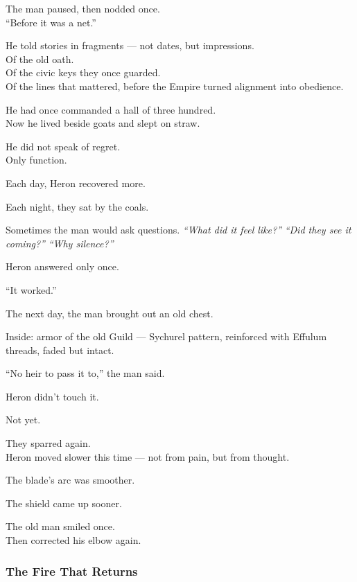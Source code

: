 \documentclass[12pt]{article}
\begin{document}
The man paused, then nodded once.\\
“Before it was a net.”

\vspace{1em}

He told stories in fragments — not dates, but impressions.\\
Of the old oath.\\
Of the civic keys they once guarded.\\
Of the lines that mattered, before the Empire turned alignment into obedience.

He had once commanded a hall of three hundred.\\
Now he lived beside goats and slept on straw.

He did not speak of regret.\\
Only function.

\vspace{1em}

Each day, Heron recovered more.

Each night, they sat by the coals.

Sometimes the man would ask questions.  
\textit{“What did it feel like?”}  
\textit{“Did they see it coming?”}  
\textit{“Why silence?”}

Heron answered only once.

“It worked.”

\vspace{1em}

The next day, the man brought out an old chest.

Inside: armor of the old Guild — Sychurel pattern, reinforced with Effulum threads, faded but intact.

“No heir to pass it to,” the man said.

Heron didn’t touch it.

Not yet.

\vspace{1em}

They sparred again.\\
Heron moved slower this time — not from pain, but from thought.

The blade’s arc was smoother.

The shield came up sooner.

The old man smiled once.\\
Then corrected his elbow again.

\dotfill

\subsubsection*{The Fire That Returns}
\end{document}

